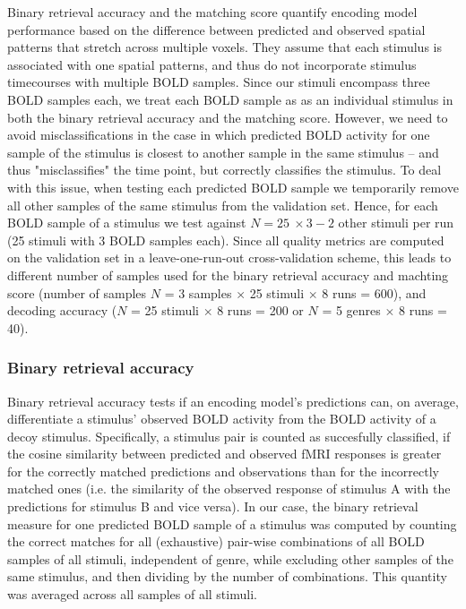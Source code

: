 Binary retrieval accuracy and the matching score quantify encoding model performance based on the difference between predicted and observed spatial patterns that stretch across multiple voxels. They assume that each stimulus is associated with one spatial patterns, and thus do not incorporate stimulus timecourses with multiple BOLD samples. Since our stimuli encompass three BOLD samples each, we treat each BOLD sample as as an individual stimulus in both the binary retrieval accuracy and the matching score. However, we need to avoid misclassifications in the case in which predicted BOLD activity for one sample of the stimulus is closest to another sample in the same stimulus -- and thus "misclassifies" the time point, but correctly classifies the stimulus. To deal with this issue, when testing each predicted BOLD sample we temporarily remove all other samples of the same stimulus from the validation set.
Hence, for each BOLD sample of a stimulus we test against $N = 25\:\times 3 - 2$ other stimuli per run (25 stimuli with 3 BOLD samples each).
Since all quality metrics are computed on the validation set in a leave-one-run-out cross-validation scheme, this leads to different number of samples used for the binary retrieval accuracy and machting score (number of samples $N$ = 3 samples $\times$ 25 stimuli $\times$ 8 runs = 600), and decoding accuracy ($N$ = 25 stimuli $\times$ 8 runs = 200 or $N$ = 5 genres $\times$ 8 runs = 40).

\subsubsection*{Binary retrieval accuracy}
%
Binary retrieval accuracy \citep{ML08} tests if an encoding model's predictions can, on average, differentiate a stimulus' observed BOLD activity from the BOLD activity of a decoy stimulus. Specifically, a stimulus pair is counted as succesfully classified, if the cosine similarity between predicted and observed f{MRI} responses is greater for the correctly matched predictions and observations than for the incorrectly matched ones (i.e. the similarity of the observed response of stimulus A with the predictions for stimulus B and vice versa). In our case, the binary retrieval measure for one predicted BOLD sample of a stimulus was computed by counting the correct matches for all (exhaustive) pair-wise combinations of all BOLD samples of all stimuli, independent of genre, while excluding other samples of the same stimulus, and then dividing by the number of combinations. This quantity was averaged across all samples of all stimuli.

